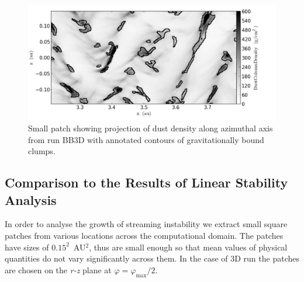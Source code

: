 \begin{figure} 
  \includegraphics[width=0.98\linewidth]{figures/fig6}
  \caption{
     Small patch showing projection of dust density along azimuthal axis from
     run BB3D with annotated contours of gravitationally bound clumps.}
  \label{fig6} 
\end{figure}

\subsection{Comparison to the Results of Linear Stability Analysis
\label{simulation_analysis}}

In order to analyse the growth of streaming instability we extract small square
patches from various locations across the computational domain. The patches have
sizes of $0.15^2$~AU$^2$, thus are small enough so that mean values of physical
quantities do not vary significantly across them. In the case of 3D run the
patches are chosen on the {\it r-z} plane at $\varphi = \varphi_\textrm{max} /
2$. 

